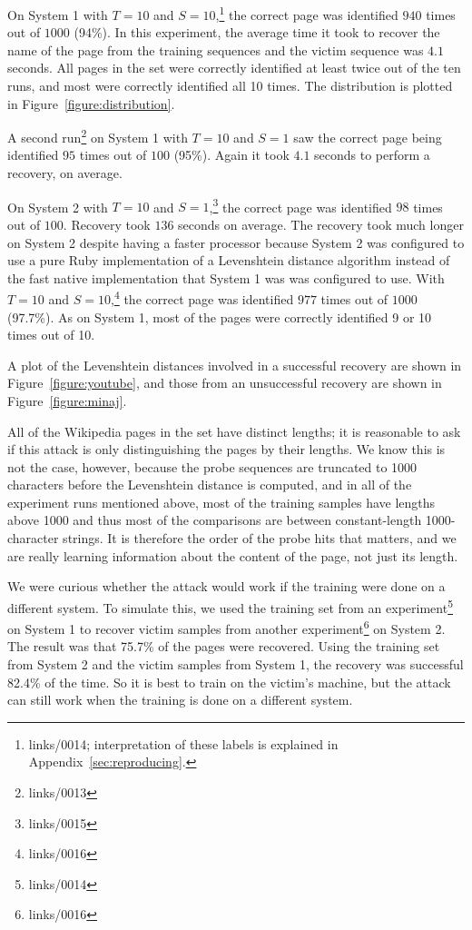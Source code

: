 \documentclass[letterpaper,twocolumn,10pt]{article}
\begin{document}
On System 1 with $T=10$ and $S=10$,\footnote{links/0014; interpretation of
these labels is explained in Appendix~\ref{sec:reproducing}.} the correct page was
identified $940$ times out of $1000$ (94\%). In this experiment,
the average time it took to recover the name of the page from the training
sequences and the victim sequence was $4.1$ seconds. All pages in the set were
correctly identified at least twice out of the ten runs, and most were correctly
identified all 10 times. The distribution is plotted in
Figure~\ref{figure:distribution}.

A second run\footnote{links/0013} on System 1 with $T=10$ and $S=1$ saw the
correct page being identified $95$ times out of $100$ (95\%).
Again it took $4.1$ seconds to perform a recovery, on average.

On System 2 with $T=10$ and $S=1$,\footnote{links/0015} the correct page was
identified $98$ times out of $100$. Recovery took $136$ seconds on average. The
recovery took much longer on System 2 despite having a faster processor because
System 2 was configured to use a pure Ruby implementation of a Levenshtein
distance algorithm instead of the fast native implementation that System 1 was
was configured to use. With $T=10$ and $S=10$,\footnote{links/0016} the correct
page was identified $977$ times out of $1000$ (97.7\%). As on System
1, most of the pages were correctly identified 9 or 10 times out of 10.

A plot of the Levenshtein distances involved in a successful recovery are shown
in Figure~\ref{figure:youtube}, and those from an unsuccessful recovery are
shown in Figure~\ref{figure:minaj}.

All of the Wikipedia pages in the set have distinct lengths; it is
reasonable to ask if this attack is only distinguishing the pages by their
lengths. We know this is not the case, however, because the probe sequences are
truncated to 1000 characters before the Levenshtein distance is computed, and in
all of the experiment runs mentioned above, most of the training samples have
lengths above 1000 and thus most of the comparisons are between constant-length
1000-character strings. It is therefore the order of the probe hits that matters, and
we are really learning information about the content of the page,
not just its length.

We were curious whether the attack would work if the training were done on
a different system. To simulate this, we used the training set from an
experiment\footnote{links/0014} on System 1 to recover victim samples from
another experiment\footnote{links/0016} on System 2. The result was that 75.7\%
of the pages were recovered. Using the training set from System 2 and the victim
samples from System 1, the recovery was successful 82.4\% of the time. So it is
best to train on the victim's machine, but the attack can still work when the
training is done on a different system.
\end{document}
